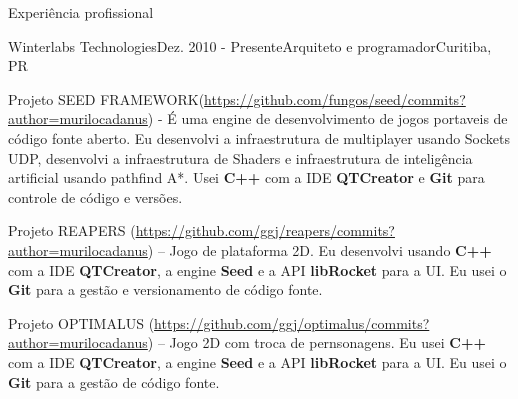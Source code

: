 \documentclass{resume}
\begin{document}
  \begin{rSection}{Experiência profissional}
    \begin{rSubsection}{Winterlabs Technologies}{Dez. 2010 - Presente}{Arquiteto e programador}{Curitiba, PR}
    \item Projeto SEED FRAMEWORK(\url{https://github.com/fungos/seed/commits?author=murilocadanus}) - É uma engine de desenvolvimento de jogos portaveis de código fonte aberto. Eu desenvolvi a infraestrutura de multiplayer usando Sockets UDP, desenvolvi a infraestrutura de Shaders e infraestrutura de inteligência artificial usando pathfind A*. Usei \textbf{C++} com a IDE \textbf{QTCreator} e \textbf{Git} para controle de código e versões. \\
    \item Projeto REAPERS (\url{https://github.com/ggj/reapers/commits?author=murilocadanus}) – Jogo de plataforma 2D. Eu desenvolvi usando \textbf{C++} com a IDE \textbf{QTCreator}, a engine \textbf{Seed} e a API \textbf{libRocket} para  a UI. Eu usei o \textbf{Git} para a gestão e versionamento de código fonte. \\
    \item Projeto OPTIMALUS (\url{https://github.com/ggj/optimalus/commits?author=murilocadanus}) – Jogo 2D com troca de pernsonagens. Eu usei \textbf{C++} com a IDE \textbf{QTCreator}, a engine \textbf{Seed} e a API \textbf{libRocket} para a UI. Eu usei o \textbf{Git} para a gestão de código fonte. \\

\end{rSubsection}
\end{rSection}
\end{document}
